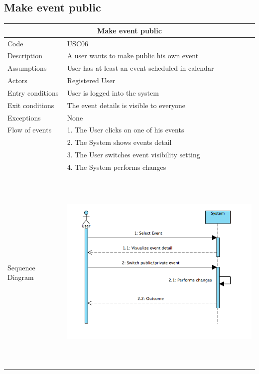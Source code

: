 \documentclass[12pt]{book}
\begin{document}
\subsection{Make event public}
\vspace*{\fill}
\begin{center}
\begin{tabular}{ |l|l| }
  		\hline
  		\hline
  		\multicolumn{2}{|c|}{\large{\textbf{Make event public}}} \\
  		\hline
  		\hline
  		Code  & USC06\\ 
		\hline
		Description &  A user wants to make public his own event\\
		\hline
		Assumptions & User has at least an event scheduled in calendar\\
		\hline
		Actors & Registered User\\
		\hline
		Entry conditions & User is logged into the system  \\
		\hline
		Exit conditions & The event details is visible to everyone \\
		\hline
		Exceptions & None \\
		\hline
		Flow of events &  
			1. The User clicks on one of his events\\&			
			2. The System shows events detail \\&
			3. The User switches event visibility setting \\&
			4. The System performs changes\\
  		\hline 
		&\\
		Sequence Diagram & \includegraphics[width=12cm, height=10cm]{eventPoliciesSD}\\
		\hline
  		\hline
\end{tabular} \\
\end{center}
\vspace*{\fill}
\end{document}
